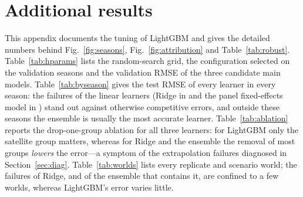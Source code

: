 \section{Additional results}\label{app:extra}
This appendix documents the tuning of LightGBM and gives the detailed numbers behind Fig.~\ref{fig:seasons}, Fig.~\ref{fig:attribution} and Table~\ref{tab:robust}. Table~\ref{tab:hparams} lists the random-search grid, the configuration selected on the validation seasons and the validation RMSE of the three candidate main models. Table~\ref{tab:byseason} gives the test RMSE of every learner in every season: the failures of the linear learners (Ridge in \worstYearRidge{} and the panel fixed-effects model in \worstYearFE) stand out against otherwise competitive errors, and outside these seasons the ensemble is usually the most accurate learner. Table~\ref{tab:ablation} reports the drop-one-group ablation for all three learners: for LightGBM only the satellite group matters, whereas for Ridge and the ensemble the removal of most groups \emph{lowers} the error---a symptom of the extrapolation failures diagnosed in Section~\ref{sec:diag}. Table~\ref{tab:worlds} lists every replicate and scenario world; the failures of Ridge, and of the ensemble that contains it, are confined to a few worlds, whereas LightGBM's error varies little.




